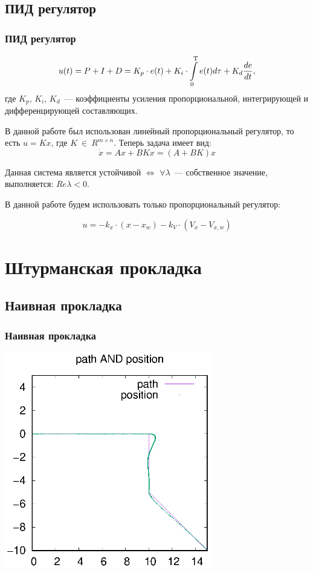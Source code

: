 \documentclass[10pt,t]{beamer}
\begin{document}
\subsection[ПИД регулятор]{ПИД регулятор}
\begin{frame}
\frametitle{ПИД регулятор}
\small

\begin{equation*}
    u(t) = P + I + D = K_p\cdot e(t) + K_i \cdot \int\limits_0^\text{\textup{T}} e(t) d\tau + K_d \frac{de}{dt},
\end{equation*} 
где $K_p$, $K_i$, $K_d$~--- коэффициенты усиления пропорциональной, интегрирующей и дифференцирующей составляющих.

В данной работе был использован линейный пропорциональный регулятор, то есть $u = Kx$, где $K~\in~R^{m\times n}$.
Теперь задача имеет вид:
\begin{equation*}\label{PID_lin}
    \Dot{x} = Ax + BKx = (A+BK)x
\end{equation*}

Данная система является устойчивой $\Longleftrightarrow$ $\forall \lambda$~--- собственное значение, выполняется: $Re\lambda < 0$.

В данной работе будем использовать только пропорциональный регулятор:

$$u = -k_x \cdot (x - x_w) - k_V\cdot (V_x - V_{x,w})$$
\end{frame}
\section[Штурманская прокладка]{Штурманская прокладка}
\subsection[Наивная прокладка]{Наивная прокладка}
\begin{frame}
\frametitle{Наивная прокладка}
\small

\pause

\centering

\includegraphics[width=90mm]{default_path_not_procladka.eps}


\end{frame}
\end{document}
